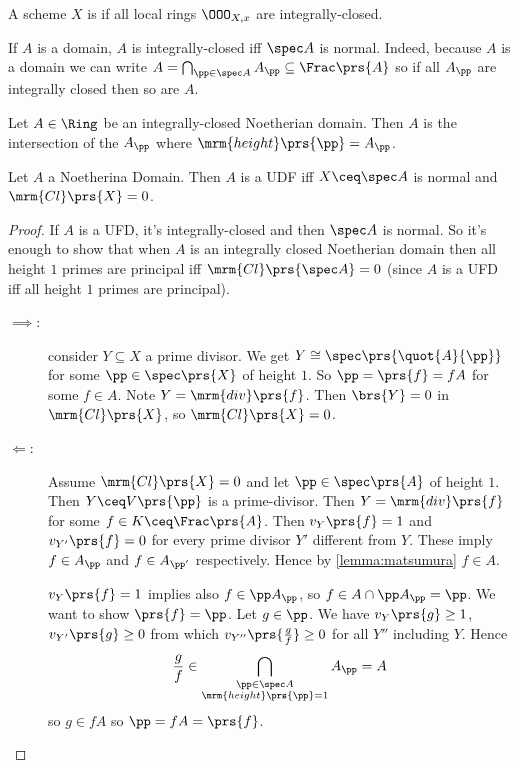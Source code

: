 \documentclass[10pt,a4paper,twoside,openany,hidelinks]{book}
\begin{document}
\begin{definition}
A scheme $X$ is  if all local rings $\OOO_{X,x}$ are integrally-closed.
\end{definition}

\begin{remark}
If $A$ is a domain, $A$ is integrally-closed iff $\spec A$ is normal.
Indeed, because $A$ is a domain we can write $A = \bigcap_{\pp \in \spec A} A_\pp \subseteq \Frac\prs{A}$ so if all $A_\pp$ are integrally closed then so are $A$.
\end{remark}

\begin{lemma} \label{lemma:matsumura}
Let $A \in \Ring$ be an integrally-closed Noetherian domain. Then
$A$ is the intersection of the $A_\pp$ where $\mrm{height}\prs{\pp} = A_\pp$.
\end{lemma}

\begin{proposition}
Let $A$ a Noetherina Domain. Then
$A$ is a UDF iff $X \ceq \spec A$ is normal and $\mrm{Cl}\prs{X} = 0$.
\end{proposition}

\begin{proof}
If $A$ is a UFD, it's integrally-closed and then $\spec A$ is normal.
So it's enough to show that when $A$ is an integrally closed Noetherian domain then
all height $1$ primes are principal iff $\mrm{Cl}\prs{\spec A} = 0$ (since $A$ is a UFD iff all height $1$ primes are principal).

\begin{description}
\item[$\implies$:]
consider $Y \subseteq X$ a prime divisor. We get $Y \cong \spec\prs{\quot{A}{\pp}}$ for some $\pp \in \spec\prs{X}$ of height $1$.
So $\pp = \prs{f} = fA$ for some $f \in A$.
Note $Y = \mrm{div}\prs{f}$.
Then $\brs{Y} = 0$ in $\mrm{Cl}\prs{X}$, so $\mrm{Cl}\prs{X} = 0$.

\item[$\Longleftarrow$:]
Assume $\mrm{Cl}\prs{X} = 0$ and let $\pp \in \spec\prs{A}$ of height $1$. Then $Y \ceq V\prs{\pp}$ is a prime-divisor. Then $Y = \mrm{div}\prs{f}$ for some $f \in K \ceq \Frac\prs{A}$.
Then $v_Y\prs{f} = 1$ and $v_{Y'}\prs{f} = 0$ for every prime divisor $Y'$ different from $Y$.
These imply $f \in A_\pp$ and $f \in A_{\pp'}$ respectively. Hence by \ref{lemma:matsumura} $f \in A$.

$v_Y\prs{f} = 1$ implies also $f \in \pp A_\pp$, so $f \in A \cap \pp A_\pp = \pp$. We want to show $\prs{f} = \pp$. Let $g \in \pp$. We have $v_Y\prs{g} \geq 1$, $v_{Y'}\prs{g} \geq 0$ from which $v_{Y''} \prs{\frac{g}{f}} \geq 0$ for all $Y''$ including $Y$.
Hence \[\frac{g}{f} \in \bigcap_{\substack{\pp \in \spec A \\ \mrm{height}\prs{\pp} = 1}} A_\pp = A\] so $g \in fA$ so $\pp = fA = \prs{f}$.
\end{description}
\end{proof}
\end{document}
